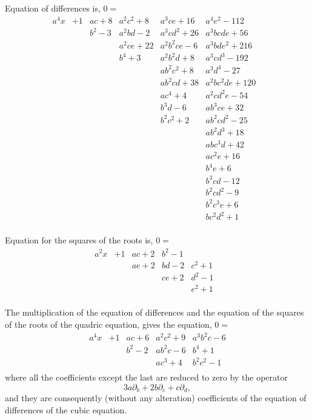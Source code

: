 \documentclass[11pt,a4paper]{book}
\begin{document}
\noindent
Equation  of  differences  is,  $0 =$
\[
\begin{array}{r|rrrrrr}
a^4 x & +1 & ac + 8 & a^2 c^2 + 8 & a^3 c e + 16 & a^4 e^2 - 112 & \\
& & b^2 - 3 & a^2 b d - 2 & a^3 c d^2 + 26 & a^3 b c d e + 56 & \\
& & & a^2 c e + 22 & a^2 b^2 c e - 6 & a^3 b d e^2 + 216 & \\
& & & b^4 + 3 & a^2 b^2 d + 8 & a^3 c d^3 - 192 & \\
& & & & a b^2 c^2 + 8 & a^3 d^4 - 27 & \\
& & & & a b^2 c d + 38 & a^2 b c^2 d e + 120 & \\
& & & & a c^4 + 4 & a^2 c d^2 e - 54 & \\
& & & & b^3 d - 6 & a b^3 c e + 32 & \\
& & & & b^2 c^2 + 2 & a b^2 c d^2 - 25 & \\
& & & & & a b^2 d^3 + 18 & \\
& & & & & a b c^3 d + 42 & \\
& & & & & a c^2 e + 16 & \\
& & & & & b^4 e + 6 & \\
& & & & & b^3 c d - 12 & \\
& & & & & b^2 c d^2 - 9 & \\
& & & & & b^2 c^3 e + 6 & \\
& & & & & b c^2 d^2 + 1 & \\
\end{array}
\]

\medskip
\noindent
Equation  for  the  squares  of  the  roots  is,  $0 =$
\[
\begin{array}{r|rrrrr}
a^2 x & +1 & ac + 2 & b^2 - 1 & & \\
& & ae + 2 & bd - 2 & c^2 + 1 & \\
& & & ce + 2 & d^2 - 1 & \\
& & & & e^2 + 1 & \\
\end{array}
\]

\medskip

The  multiplication  of  the  equation  of  differences  and  the  equation  of  the  squares
of  the  roots  of  the  quadric  equation,  gives  the  equation,  $0 =$
\[
\begin{array}{r|rrrr}
a^4 x & +1 & ac + 6 & a^2 c^2 + 9 & a^3 b^2 c - 6 \\
& & b^2 - 2 & a b^2 c - 6 & b^4 + 1 \\
& & & a c^3 + 4 & b^2 c^2 - 1 \\
\end{array}
\]
where  all  the  coefficients  except  the  last  are  reduced  to  zero  by  the  operator
\[
3a\partial_b + 2b\partial_c + c\partial_d,
\]
and  they  are  consequently  (without  any  alteration)  coefficients  of  the  equation  of  differences  of  the  cubic  equation.
\end{document}
